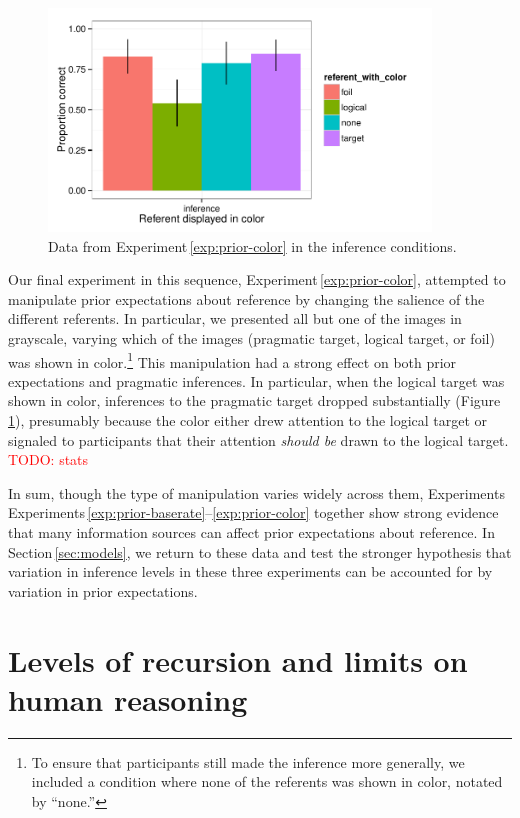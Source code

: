 \documentclass[man,noapacite]{apa2}
\newcommand{\red}[1]{\textcolor{red}{#1}}
\newcounter{Experiment}
\newcommand{\exptref}[1]{Experiment\,\ref{#1}}
\newcommand{\exptrefrange}[2]{Experiments\,\ref{#1}--\ref{#2}}
\newcommand{\secref}[1]{Section\,\ref{#1}}
\begin{document}
\begin{figure}[t]
  \centering
  \includegraphics[width=4in]{../plots/2-prior-color.pdf}
  \caption{\label{fig:prior-color} Data from \exptref{exp:prior-color} in the inference conditions.}
\end{figure}

Our final experiment in this sequence, \exptref{exp:prior-color}, attempted to manipulate prior expectations about reference by changing the salience of the different referents. In particular, we presented all but one of the images in grayscale, varying which of the images (pragmatic target, logical target, or foil) was shown in color.\footnote{To ensure that participants still made the inference more generally, we included a condition where none of the referents was shown in color, notated by ``none.''} This manipulation had a strong effect on both prior expectations and pragmatic inferences. In particular, when the logical target was shown in color, inferences to the pragmatic target dropped substantially (Figure \ref{fig:prior-color}), presumably because the color either drew attention to the logical target or signaled to participants that their attention \emph{should be} drawn to the logical target. \red{TODO: stats}

In sum, though the type of manipulation varies widely across them, Experiments \exptrefrange{exp:prior-baserate}{exp:prior-color} together show strong evidence that many information sources can affect prior expectations about reference. In \secref{sec:models}, we return to these data and test the stronger hypothesis that variation in inference levels in these three experiments can be accounted for by variation in prior expectations.


\section{Levels of recursion and limits on human reasoning}
\label{sec:levels}
\end{document}
